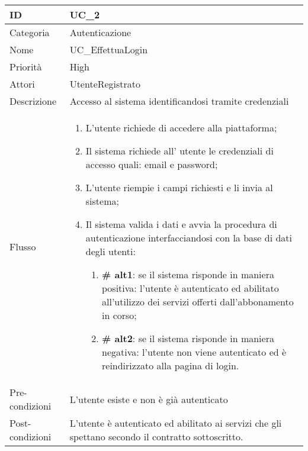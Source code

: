 \begin{center}
\begin{tabular}{ |p{2cm}|p{13cm}|  }
\hline
ID & UC\_2 \\\hline
Categoria & Autenticazione \\\hline
Nome & UC\_EffettuaLogin \\\hline
Priorità & High \\\hline
Attori &  UtenteRegistrato \\\hline
Descrizione & Accesso al sistema identificandosi tramite credenziali \\\hline
Flusso &  	\begin{enumerate}
			\item L'utente richiede di accedere alla piattaforma;
			\item Il sistema richiede all' utente le credenziali di accesso quali: email e password;
			\item L'utente riempie i campi richiesti e li invia al sistema;
			\item Il sistema valida i dati e avvia la procedura di autenticazione interfacciandosi con la base di dati degli utenti:
			\begin{enumerate}[  ]
				\item \textbf{\# alt1}: se il sistema risponde in maniera positiva: l'utente è autenticato ed abilitato all'utilizzo dei servizi offerti dall'abbonamento in corso; 
				\item \textbf{\# alt2}: se il sistema risponde in maniera negativa: l'utente non viene autenticato ed è reindirizzato alla pagina di login.
			\end{enumerate}
		\end{enumerate}\\\hline
Pre-condizioni &  L'utente esiste e non è già autenticato\\\hline
Post-condizioni &  L'utente è autenticato ed abilitato ai servizi che gli spettano secondo il contratto sottoscritto.\\\hline
\end{tabular}
\label{table_use_case:2}\newline


\end{center}
